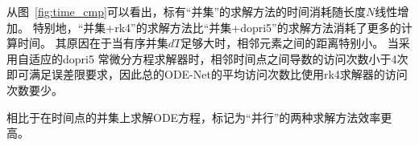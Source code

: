 从图~\ref{fig:time_cmp}可以看出，标有“并集”的求解方法的时间消耗随长度$N$线性增加。
特别地，“并集+rk4”的求解方法比“并集+dopri5”的求解方法消耗了更多的计算时间。
其原因在于当有序并集$dT$足够大时，相邻元素之间的距离特别小。
当采用自适应的dopri5 常微分方程求解器时，相邻时间点之间导数的访问次数小于4次即可满足误差限要求，因此总的ODE-Net的平均访问次数比使用rk4求解器的访问次数要少。

相比于在时间点的并集上求解ODE方程，标记为“并行”的两种求解方法效率更高。

